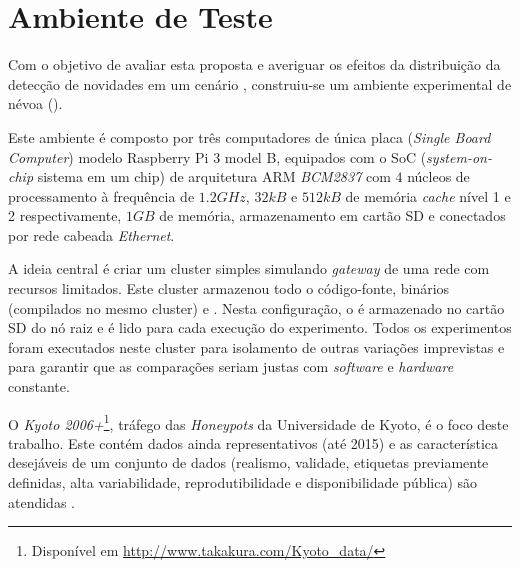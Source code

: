 
\section{Ambiente de Teste}\label{sec:ambiente}

Com o objetivo de avaliar esta proposta e averiguar os efeitos da distribuição
da detecção de novidades em um cenário \iot, construiu-se um ambiente
experimental de névoa (\fog).

Este ambiente é composto por três computadores de única placa (\emph{Single
Board Computer}) modelo Raspberry Pi 3 model B, equipados com o SoC
(\emph{system-on-chip} sistema em um chip) de arquitetura ARM \emph{BCM2837} com
$4$ núcleos de processamento à frequência de $1.2GHz$, $32kB$ e $512kB$ de
memória \emph{cache} nível 1 e 2 respectivamente, $1GB$ de memória,
armazenamento em cartão SD e conectados por rede cabeada \emph{Ethernet}.

A ideia central é criar um cluster simples simulando \emph{gateway} de uma rede
\iot com recursos limitados.
Este cluster armazenou todo o código-fonte, binários (compilados no mesmo cluster) e
\dataset.
Nesta configuração, o \dataset é armazenado no cartão SD do nó raiz e é lido para
cada execução do experimento.
Todos os experimentos foram executados neste cluster para isolamento de outras
variações imprevistas e para garantir que as comparações seriam justas com
\emph{software} e \emph{hardware} constante.


O \dataset \emph{Kyoto 2006+}\footnote{Disponível em
\url{http://www.takakura.com/Kyoto\_data/}}, tráfego das \emph{Honeypots} da
Universidade de Kyoto, é o foco deste trabalho.
Este \dataset contém dados ainda representativos (até 2015) e as característica
desejáveis de um conjunto de dados (realismo, validade, etiquetas previamente
definidas, alta variabilidade, reprodutibilidade e disponibilidade pública) são
atendidas \cite{KyotoDataset,Song2011kyoto}.

